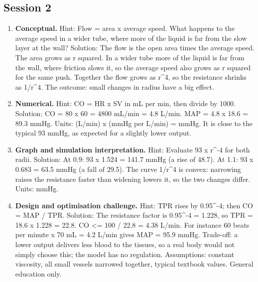 \documentclass[11pt,a4paper]{article}
\begin{document}
\subsection*{Session 2}
\begin{enumerate}[nosep]
\item \textbf{Conceptual.} Hint: Flow = area x average speed. What happens to the average speed in a wider tube, where more of the liquid is far from the slow layer at the wall? Solution: The flow is the open area times the average speed. The area grows as r squared. In a wider tube more of the liquid is far from the wall, where friction slows it, so the average speed also grows as r squared for the same push. Together the flow grows as r\textasciicircum{}4, so the resistance shrinks as 1/r\textasciicircum{}4. The outcome: small changes in radius have a big effect.
\item \textbf{Numerical.} Hint: CO = HR x SV in mL per min, then divide by 1000. Solution: CO = 80 x 60 = 4800 mL/min = 4.8 L/min. MAP = 4.8 x 18.6 = 89.3 mmHg. Units: (L/min) x (mmHg per L/min) = mmHg. It is close to the typical 93 mmHg, as expected for a slightly lower output.
\item \textbf{Graph and simulation interpretation.} Hint: Evaluate 93 x r\textasciicircum{}-4 for both radii. Solution: At 0.9: 93 x 1.524 = 141.7 mmHg (a rise of 48.7). At 1.1: 93 x 0.683 = 63.5 mmHg (a fall of 29.5). The curve 1/r\textasciicircum{}4 is convex: narrowing raises the resistance faster than widening lowers it, so the two changes differ. Units: mmHg.
\item \textbf{Design and optimisation challenge.} Hint: TPR rises by 0.95\textasciicircum{}-4; then CO = MAP / TPR. Solution: The resistance factor is 0.95\textasciicircum{}-4 = 1.228, so TPR = 18.6 x 1.228 = 22.8. CO \textless{}= 100 / 22.8 = 4.38 L/min. For instance 60 beats per minute x 70 mL = 4.2 L/min gives MAP = 95.9 mmHg. Trade-off: a lower output delivers less blood to the tissues, so a real body would not simply choose this; the model has no regulation. Assumptions: constant viscosity, all small vessels narrowed together, typical textbook values. General education only.
\end{enumerate}
\end{document}
